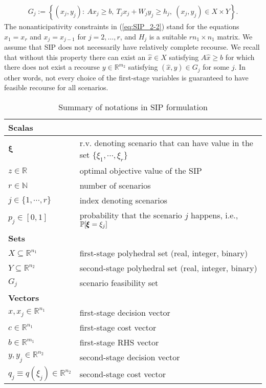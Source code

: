\begin{align}
G_j:=\left\{ (x_j,y_j): \ Ax_j\ge b,\  T_j x_j+W_j y_j\ge h_j,\ (x_j,y_j)\in X\times Y  \right\}.
\end{align}
The nonanticipativity constraints in (\ref{eq:SIP_2-2}) stand for the equations $x_1=x_r$ and $x_j=x_{j-1}$ for $j=2,\ldots,r$, and $H_j$ is a suitable $rn_1\times n_1$ matrix. We assume that SIP does not necessarily have relatively complete recourse. We recall that without this property there can exist an $\hat{x}\in X$ satisfying $A\hat{x}\ge b$ for which there does not exist a recourse $y\in\mathbb{R}^{m_2}$ satisfying $(\hat{x},y)\in G_j$ for some $j$. In other words, not every choice of the first-stage variables is guaranteed to have feasible recourse for all scenarios.
\begin{table}[H]
	\caption{Summary of notations in SIP formulation}
	\label{notation:SIP}
	\resizebox{\textwidth}{!}
	{
		\begin{tabular}{ll}
			\toprule
			\textbf{Scalas}	&	\\  \midrule
			$\pmb{\xi}$	& r.v. denoting scenario that can have value in the set $\{\xi_1,\cdots,\xi_r\}$ 	\\			
			$z\in\mathbb{R}$ & optimal objective value of the SIP \\ 
			$r\in\mathbb{N}$	& number of scenarios	\\	
			$j\in\{1,\cdots,r\}$	& index denoting scenarios	\\
			$p_j\in[0,1]$ & probability that the scenario $j$ happens, i.e., $\operatorname*{\mathbb{P}}[\pmb{\xi}=\xi_j]$ \\ \midrule
			\textbf{Sets} &  \\  \midrule
			$X\subseteq\mathbb{R}^{n_1}$	& first-stage polyhedral set (real, integer, binary)\\
			$Y\subseteq\mathbb{R}^{n_2}$	& second-stage polyhedral set (real, integer, binary)\\
			$G_j$	& scenario feasibility set\\ \midrule
			\textbf{Vectors} &   \\  \midrule
			$x,x_j\in\mathbb{R}^{n_1}$	& first-stage decision vector	\\
			$c\in \mathbb{R}^{n_1}$	& first-stage cost vector\\
			$b\in\mathbb{R}^{m_1}$	& first-stage RHS vector\\
			$y,y_j\in\mathbb{R}^{n_2}$	& second-stage decision vector	\\
			$q_j\equiv q(\xi_j)\in\mathbb{R}^{n_2}$	& second-stage cost vector \\

\end{tabular}}
\end{table}
